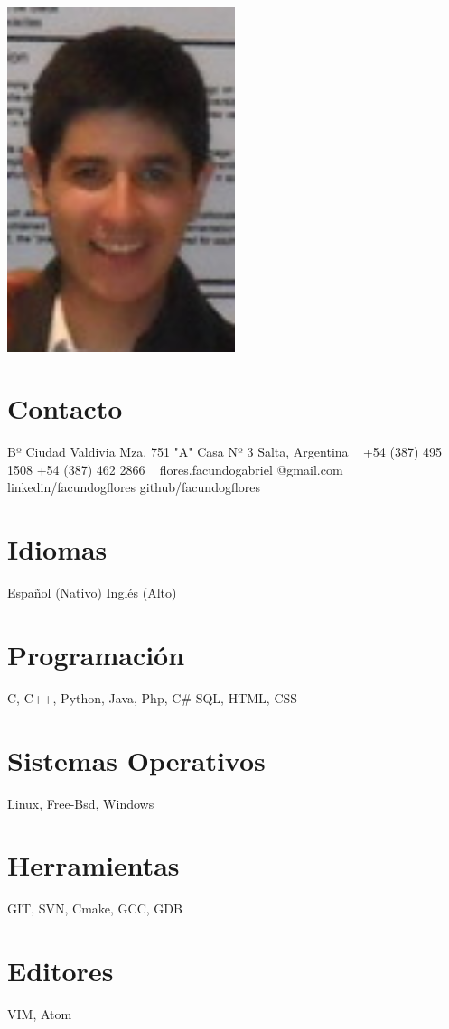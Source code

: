 \documentclass[]{cv-style}          %
\begin{document}
\lastupdated


\begin{aside}
%
\includegraphics[width=0.5\textwidth]{profile.png}
\section{Contacto}
Bº Ciudad Valdivia
Mza. 751 "A" Casa Nº 3
Salta, Argentina
~
+54 (387) 495 1508
+54 (387) 462 2866
~
flores.facundogabriel
@gmail.com
~
linkedin/facundogflores
github/facundogflores
%
\section{Idiomas}
Español (Nativo)
Inglés (Alto)
%
\section{Programación}
C, C++, Python, Java, Php, C\#
SQL, HTML, CSS
%
\section{Sistemas Operativos}
 Linux, Free-Bsd, Windows
%
\section{Herramientas}
 GIT, SVN, Cmake, GCC, GDB
%
\section{Editores}
 VIM, Atom
%
\end{aside}
\end{document}
